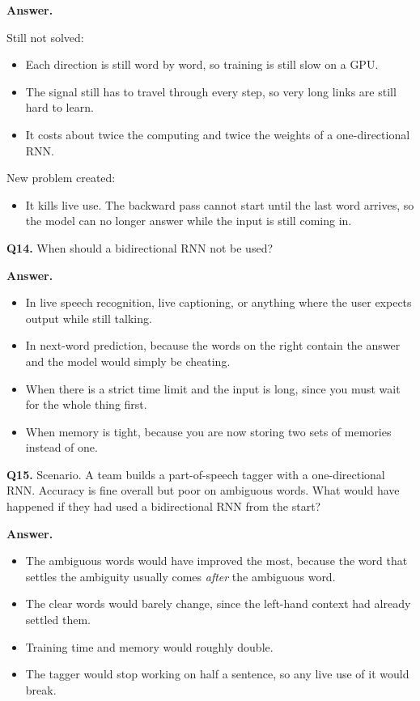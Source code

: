 \documentclass[11pt]{article}
\begin{document}
\textbf{Answer.}

Still not solved:
\begin{itemize}
  \item Each direction is still word by word, so training is still slow on a GPU.
  \item The signal still has to travel through every step, so very long links are still hard to learn.
  \item It costs about twice the computing and twice the weights of a one-directional RNN.
\end{itemize}

New problem created:
\begin{itemize}
  \item It kills live use. The backward pass cannot start until the last word arrives, so the model can no longer answer while the input is still coming in.
\end{itemize}

\medskip
\textbf{Q14.} When should a bidirectional RNN not be used?

\textbf{Answer.}
\begin{itemize}
  \item In live speech recognition, live captioning, or anything where the user expects output while still talking.
  \item In next-word prediction, because the words on the right contain the answer and the model would simply be cheating.
  \item When there is a strict time limit and the input is long, since you must wait for the whole thing first.
  \item When memory is tight, because you are now storing two sets of memories instead of one.
\end{itemize}

\medskip
\textbf{Q15.} Scenario. A team builds a part-of-speech tagger with a one-directional RNN.
Accuracy is fine overall but poor on ambiguous words. What would have happened if they had
used a bidirectional RNN from the start?

\textbf{Answer.}
\begin{itemize}
  \item The ambiguous words would have improved the most, because the word that settles the ambiguity usually comes \emph{after} the ambiguous word.
  \item The clear words would barely change, since the left-hand context had already settled them.
  \item Training time and memory would roughly double.
  \item The tagger would stop working on half a sentence, so any live use of it would break.
\end{itemize}
\end{document}
